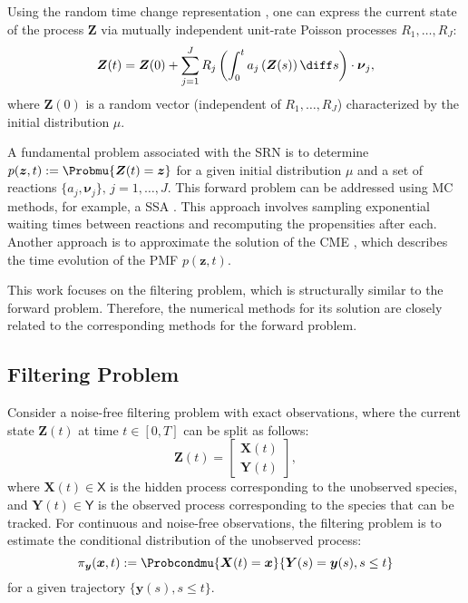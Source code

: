 Using the random time change representation \cite{Ethier1986MarkovProcess}, one can express the current state of the process $\boldsymbol{Z}$ via mutually independent unit-rate Poisson processes $R_1, \dots, R_J$:
\begin{equation}
\label{eq:RTC_representation}
    \boldsymbol{Z}(t) = \boldsymbol{Z}(0) + \sum_{j=1}^{J} R_j \left( \int_0^t  a_j \left( \boldsymbol{Z}(s) \right) \diff s \right) \cdot \boldsymbol{\nu}_j ,
\end{equation}
where $\boldsymbol{Z}(0)$ is a random vector (independent of $R_1, \dots, R_J$) characterized by the initial distribution $\mu$. 

A fundamental problem associated with the \ac{SRN} is to determine $p (\boldsymbol{z}, t) := \Probmu{\boldsymbol{Z}(t) = \boldsymbol{z}}$ for a given initial distribution $\mu$ and a set of reactions $\{ a_j, \boldsymbol{\nu}_j \}, \, j = 1,\dots,J$. This forward problem can be addressed using \ac{MC} methods, for example, a \acf{SSA} \cite{Gillespie1977SSA}. This approach involves sampling exponential waiting times between reactions and recomputing the propensities after each. Another approach is to approximate the solution of the \acf{CME} \cite{Gillespie1992DerivationCME}, which describes the time evolution of the \ac{PMF} $p(\boldsymbol{z}, t)$.

This work focuses on the filtering problem, which is structurally similar to the forward problem. Therefore, the numerical methods for its solution are closely related to the corresponding methods for the forward problem.










\subsection{Filtering Problem}
\label{subsec:filtering_problem}
Consider a noise-free filtering problem with exact observations, where the current state $\boldsymbol{Z}(t)$ at time $t \in [0, T]$ can be split as follows:
$$
    \boldsymbol{Z}(t) = \begin{bmatrix} \boldsymbol{X}(t) \\ \boldsymbol{Y}(t) \end{bmatrix},
$$
where $\boldsymbol{X}(t) \in \mathsf{X}$ is the hidden process corresponding to the unobserved species, and $\boldsymbol{Y}(t) \in \mathsf{Y}$ is the observed process corresponding to the species that can be tracked. For continuous and noise-free observations, the filtering problem is to estimate the conditional distribution of the unobserved process:
\begin{equation}
\label{eq:pi_def}    
    \pi_{\boldsymbol{y}} (\boldsymbol{x}, t) := \Probcondmu{\boldsymbol{X}(t) = \boldsymbol{x} }{ \boldsymbol{Y}(s) = \boldsymbol{y}(s), s \leq t }
\end{equation}
for a given trajectory $\{ \boldsymbol{y}(s), s \leq t \}$. 

